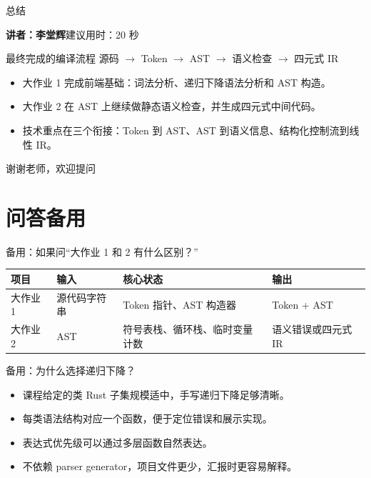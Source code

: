 \documentclass[aspectratio=169]{ctexbeamer}
\newcommand{\speaker}[2]{%
    \vspace{-0.4em}
    \begin{flushright}
        \scriptsize\color{mainblue}\textbf{讲者：#1}\quad 建议用时：#2
    \end{flushright}
    \vspace{-0.7em}
}
\begin{document}
\begin{frame}{总结}
    \speaker{李堂辉}{20 秒}
    \begin{block}{最终完成的编译流程}
        \centering
        源码 $\rightarrow$ Token $\rightarrow$ AST $\rightarrow$ 语义检查 $\rightarrow$ 四元式 IR
    \end{block}
    \begin{itemize}
        \item 大作业 1 完成前端基础：词法分析、递归下降语法分析和 AST 构造。
        \item 大作业 2 在 AST 上继续做静态语义检查，并生成四元式中间代码。
        \item 技术重点在三个衔接：Token 到 AST、AST 到语义信息、结构化控制流到线性 IR。
    \end{itemize}
    \vfill
    \centering
    \Large 谢谢老师，欢迎提问
\end{frame}

\appendix
\section{问答备用}

\begin{frame}{备用：如果问“大作业 1 和 2 有什么区别？”}
    \begin{table}
    \centering
    \small
    \begin{tabular}{llll}
        \toprule
        \textbf{项目} & \textbf{输入} & \textbf{核心状态} & \textbf{输出} \\
        \midrule
        大作业 1 & 源代码字符串 & Token 指针、AST 构造器 & Token + AST \\
        大作业 2 & AST & 符号表栈、循环栈、临时变量计数 & 语义错误或四元式 IR \\
        \bottomrule
    \end{tabular}
    \end{table}
\end{frame}

\begin{frame}{备用：为什么选择递归下降？}
    \begin{itemize}
        \item 课程给定的类 Rust 子集规模适中，手写递归下降足够清晰。
        \item 每类语法结构对应一个函数，便于定位错误和展示实现。
        \item 表达式优先级可以通过多层函数自然表达。
        \item 不依赖 parser generator，项目文件更少，汇报时更容易解释。
    \end{itemize}
\end{frame}
\end{document}
